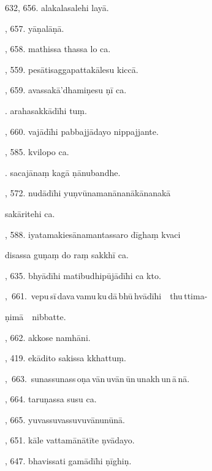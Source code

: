 632, 656. alakalasalehi layā.\hfill \pageref{sut:632}\par {}, 657. yāṇalāṇā.\hfill \pageref{sut:633}\par {}, 658. mathissa thassa lo ca.\hfill \pageref{sut:634}\par {}, 559. pesātisaggapattakālesu kiccā.\hfill \pageref{sut:635}\par {}, 659. avassakā’dhamiṇesu ṇī ca.\hfill \pageref{sut:636}\par {}. arahasakkādīhi tuṃ.\hfill \pageref{sut:637}\par {}, 660. vajādīhi pabbajjādayo nippajjante.\hfill \pageref{sut:638}\par {}, 585. kvilopo ca.\hfill \pageref{sut:639}\par {}. sacajānaṃ kagā ṇānubandhe.\hfill \pageref{sut:640}\par {}, 572. nudādīhi yuṇvūnamanānanākānanakā\par \noindent
\hspace{15mm} sakāritehi ca.\hfill \pageref{sut:641}\par {}, 588. iyatamakiesānamantassaro dīghaṃ kvaci\par \noindent
\hspace{15mm} disassa guṇaṃ do raṃ sakkhī ca.\hfill \pageref{sut:642}\par {}, 635. bhyādīhi matibudhipūjādīhi ca kto.\hfill \pageref{sut:643}\par {},~661.~vepu\,sī\,dava\,vamu\,ku\,dā\,bhū\,hvādīhi\ \ thu\,ttima-\par \noindent
\hspace{15mm} ṇimā\ \ nibbatte.\hfill \pageref{sut:644}\par {}, 662. akkose namhāni.\hfill \pageref{sut:645}\par {}, 419. ekādito sakissa kkhattuṃ.\hfill \pageref{sut:646}\par {},~663.~sunassunass\,oṇa\,vān\,uvān\,ūn\,unakh\,un\,ā\,nā.\hfill \pageref{sut:647}\par {}, 664. taruṇassa susu ca.\hfill \pageref{sut:648}\par {}, 665. yuvassuvassuvuvānunūnā.\hfill \pageref{sut:649}\par {}, 651. kāle vattamānātīte ṇvādayo.\hfill \pageref{sut:650}\par {}, 647. bhavissati gamādīhi ṇīghiṇ.\hfill \pageref{sut:651}\par \noindent
